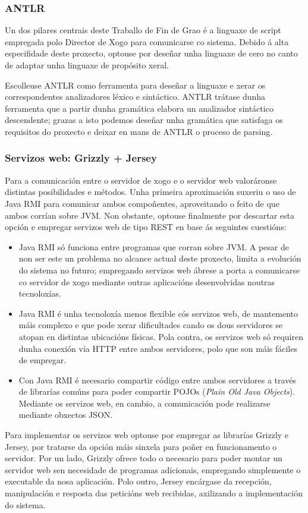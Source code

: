 \subsubsection{ANTLR}
Un dos pilares centrais deste Traballo de Fin de Grao é a linguaxe de script
empregada polo Director de Xogo para comunicarse co sistema. Debido á alta
especifidade deste proxecto, optouse por deseñar unha linguaxe de
cero no canto de adaptar unha linguaxe de propósito xeral.
\par
Escolleuse ANTLR como ferramenta para deseñar a linguaxe e xerar os
correspondentes analizadores léxico e sintáctico. ANTLR trátase dunha ferramenta
que a partir dunha gramática elabora un analizador sintáctico descendente;
grazas a isto podemos deseñar unha gramática que satisfaga os requisitos do
proxecto e deixar en mans de ANTLR o proceso de parsing.

\subsubsection{Servizos web: Grizzly + Jersey}
Para a comunicación entre o servidor de xogo e o servidor web valoráronse
distintas posibilidades e métodos. Unha primeira aproximación suxeriu o uso de
Java RMI para comunicar ambos compoñentes, aproveitando o feito de que ambos
corrían sobre JVM. Non obstante, optouse finalmente por descartar esta
opción e empregar servizos web de tipo REST en base ás seguintes cuestións:
\begin{itemize}
  \item Java RMI só funciona entre programas que corran sobre JVM. A pesar de
  non ser este un problema no alcance actual deste proxecto, limita a evolución
  do sistema no futuro; empregando servizos web ábrese a porta a comunicarse co
  servidor de xogo mediante outras aplicacións desenvolvidas noutras
  tecnoloxías.
  \item Java RMI é unha tecnoloxía menos flexible cós servizos
  web, de mantemento máis complexo e que pode xerar dificultades cando os dous
  servidores se atopan en distintas ubicacións físicas. Pola contra, os servizos
  web só requiren dunha conexión vía HTTP entre ambos servidores, polo que son
  máis fáciles de empregar.
  \item Con Java RMI é necesario compartir código entre ambos servidores a
  través de librarías comúns para poder compartir POJOs ({\it Plain Old Java
  Objects}). Mediante os servizos web, en cambio, a comunicación pode realizarse
  mediante obxectos JSON.
\end{itemize}
Para implementar os servizos web optouse por empregar as librarías Grizzly e
Jersey, por tratarse da opción máis sinxela para poñer en funcionamento o
servidor. Por un lado, Grizzly ofrece todo o necesario para poder montar un
servidor web sen necesidade de programas adicionais, empregando simplemente o
executable da nosa aplicación. Polo outro, Jersey encárgase da recepción,
manipulación e resposta das peticións web recibidas, axilizando a
implementación do sistema.

